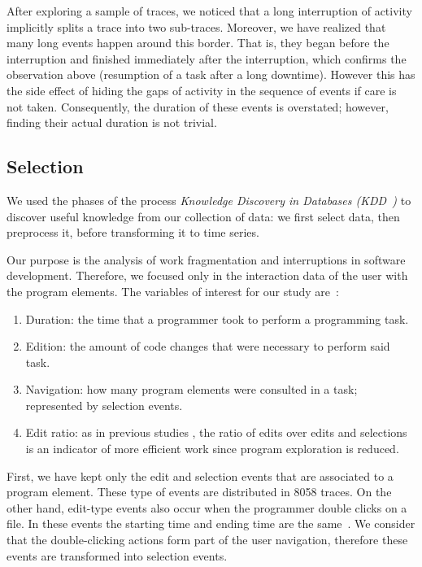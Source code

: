 \documentclass[times]{smrauth}
\begin{document}
After exploring a sample of traces, we noticed that a long interruption of activity implicitly splits a trace into two sub-traces.  Moreover,  we have realized that many long events happen around this border. That is, they began before the interruption and finished immediately after the interruption, which confirms the observation above (resumption of a task after a long downtime). However this has the side effect of hiding the gaps of activity in the sequence of events if care is not taken. Consequently, the duration of these events is overstated; however, finding their actual duration is not trivial. 

\subsection{Selection}
We used the phases of the process \textit{Knowledge Discovery in Databases (KDD~\cite{FPP96})} to discover useful knowledge from our collection of data: we first select data, then preprocess it, before transforming it to time series.

Our purpose is the analysis of work fragmentation and interruptions in software development. Therefore, we focused only in the interaction data of the user with the program elements. The  variables of interest for our study are~\cite{RD13}:
\begin{enumerate}
	\item Duration: the time that a programmer took to perform a programming task. 
	\item Edition:  the amount of code changes that were necessary to perform said task. %
	\item Navigation: how many program elements were consulted in a task; represented by selection events.
	\item Edit ratio: as in previous studies \cite{KM06}, the ratio of edits over edits and selections is an indicator of more efficient work since program exploration is reduced.
\end{enumerate}

First, we have kept only the edit and selection events that are associated to a program element. These type of events are distributed in 8058 traces. On the other hand, edit-type events also occur when the programmer double clicks on a file. In these events the starting time and ending time are the same~\cite{LJD11}. We consider that the double-clicking actions form part of the user navigation, therefore these events are transformed into selection events.  
\end{document}
